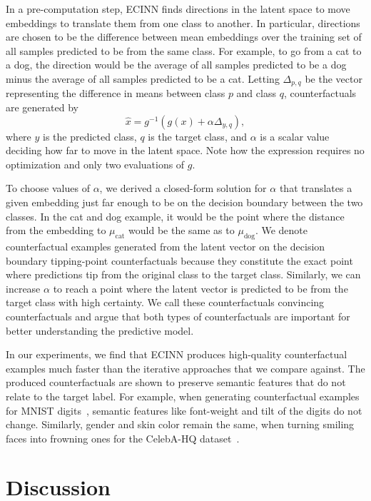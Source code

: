 \documentclass[11pt,a4paper,twoside,openright,final]{memoir}
\begin{document}
In a pre-computation step, ECINN finds directions in the latent space to move embeddings to translate them from one class to another.
In particular, directions are chosen to be the difference between mean embeddings over the training set of all samples predicted to be from the same class.
For example, to go from a cat to a dog, the direction would be the average of all samples predicted to be a dog minus the average of all samples predicted to be a cat.
Letting $\Delta_{p, q}$ be the vector representing the difference in means between class $p$ and class $q$, counterfactuals are generated by
\begin{equation}
    \hat x = g^{-1}( g(x) + \alpha\Delta_{y, q}),
\end{equation}
where $y$ is the predicted class, $q$ is the target class, and $\alpha$ is a scalar value deciding how far to move in the latent space.
Note how the expression requires no optimization and only two evaluations of $g$.

To choose values of $\alpha$, we derived a closed-form solution for $\alpha$ that translates a given embedding just far enough to be on the decision boundary between the two classes.
In the cat and dog example, it would be the point where the distance from the embedding to $\mu_{\text{cat}}$ would be the same as to $\mu_{\text{dog}}$. 
We denote counterfactual examples generated from the latent vector on the decision boundary tipping-point counterfactuals because they constitute the exact point where predictions tip from the original class to the target class.
Similarly, we can increase $\alpha$ to reach a point where the latent vector is predicted to be from the target class with high certainty.
We call these counterfactuals convincing counterfactuals and argue that both types of counterfactuals are important for better understanding the predictive model.

In our experiments, we find that ECINN produces high-quality counterfactual examples much faster than the iterative approaches that we compare against. 
The produced counterfactuals are shown to preserve semantic features that do not relate to the target label.
For example, when generating counterfactual examples for MNIST digits~\cite{mnist}, semantic features like font-weight and tilt of the digits do not change.
Similarly, gender and skin color remain the same, when turning smiling faces into frowning ones for the CelebA-HQ dataset~\cite{celeba-hq}.


\section{Discussion} 
\end{document}
